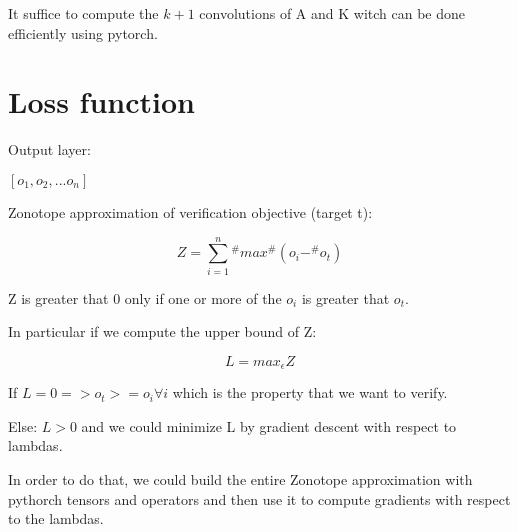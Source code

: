 \documentclass{article}
\begin{document}
It suffice to compute the $k+1$ convolutions of A and K witch can be done efficiently using pytorch.

\section{Loss function}

Output layer: 

$[o_1, o_2, ... o_n]$

Zonotope approximation of verification objective (target t):

\begin{equation}
Z = \sum_{i=1}^{n} ^\# max^\#(o_i -^\# o_t)
\end{equation}

Z is greater that 0 only if one or more of the $o_i$ is greater that $o_t$.

In particular if we compute the upper bound of Z:

\begin{equation}
L = max_\epsilon Z
\end{equation}

If $L = 0 => o_t >= o_i \forall i$ which is the property that we want to verify.

Else: $L > 0$ and we could minimize L by gradient descent with respect to lambdas.

In order to do that, we could build the entire Zonotope approximation with pythorch tensors and operators and then use it to compute gradients with respect to the lambdas.
\end{document}
